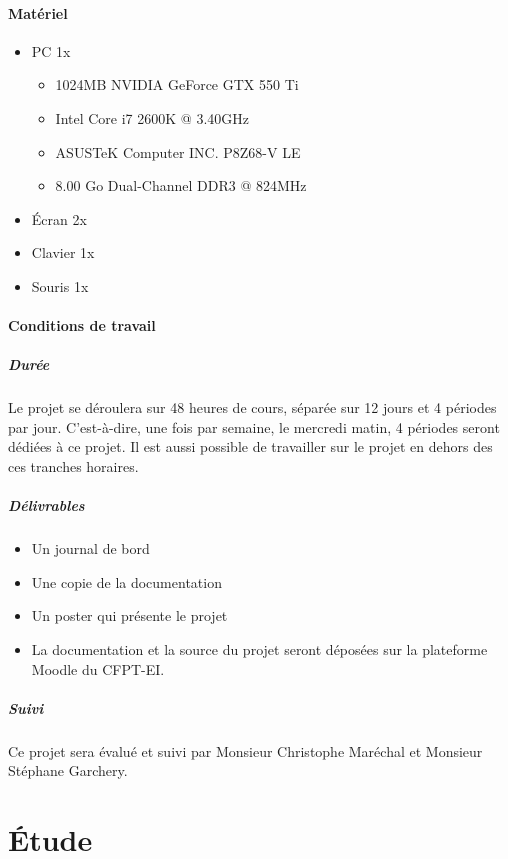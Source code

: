 \documentclass[11pt, a4paper, oneside]{article}
\begin{document}
\subsection{Matériel}
\begin{itemize}
\item PC 1x
	\begin{itemize}
	\item 1024MB NVIDIA GeForce GTX 550 Ti
	\item Intel Core i7 2600K @ 3.40GHz
	\item ASUSTeK Computer INC. P8Z68-V LE
	\item 8.00 Go Dual-Channel DDR3 @ 824MHz
	\end{itemize}
\item Écran 2x
\item Clavier 1x
\item Souris 1x
\end{itemize}
\subsection{Conditions de travail}
\subsubsection{Durée}
Le projet se déroulera sur 48 heures de cours, séparée sur 12 jours et 4 périodes par jour. C'est-à-dire, une fois par semaine, le mercredi matin, 4 périodes seront dédiées à ce projet. Il est aussi possible de travailler sur le projet en dehors des ces tranches horaires.
\subsubsection{Délivrables}
\begin{itemize}
\item Un journal de bord
\item Une copie de la documentation
\item Un poster qui présente le projet
\item La documentation et la source du projet seront déposées sur la plateforme Moodle du CFPT-EI.
\end{itemize}
\subsubsection{Suivi}
Ce projet sera évalué et suivi par Monsieur Christophe Maréchal et Monsieur Stéphane Garchery.
\newpage
\part{Étude}
\end{document}

